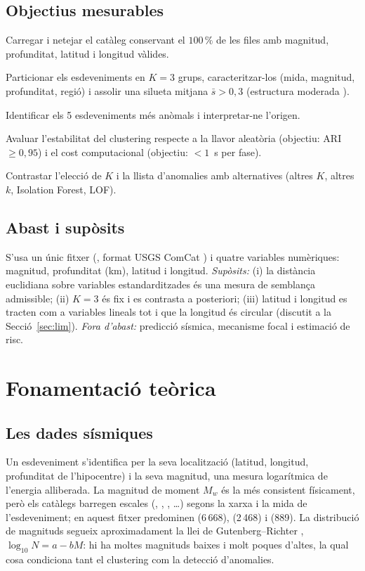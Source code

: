 \documentclass[10.5pt,a4paper]{article}
\newcommand{\py}[1]{\texttt{\detokenize{#1}}}
\begin{document}
\subsection{Objectius mesurables}
\begin{description}[leftmargin=1.1cm,labelwidth=0.9cm]
\item[O1] Carregar i netejar el catàleg conservant el $100\,\%$ de les files amb magnitud, profunditat, latitud i longitud vàlides.
\item[O2] Particionar els esdeveniments en $K=3$ grups, caracteritzar-los (mida, magnitud, profunditat, regió) i assolir una silueta mitjana $\bar s>0{,}3$ (estructura moderada \cite{kaufman}).
\item[O3] Identificar els 5 esdeveniments més anòmals i interpretar-ne l'origen.
\item[O4] Avaluar l'estabilitat del clustering respecte a la llavor aleatòria (objectiu: ARI $\ge0{,}95$) i el cost computacional (objectiu: $<1$~s per fase).
\item[O5] Contrastar l'elecció de $K$ i la llista d'anomalies amb alternatives (altres $K$, altres $k$, Isolation Forest, LOF).
\end{description}

\subsection{Abast i supòsits}
S'usa un únic fitxer (\py{earthquakes.csv}, format USGS ComCat \cite{usgs}) i quatre variables numèriques: magnitud, profunditat (km), latitud i longitud. \emph{Supòsits:} (i) la distància euclidiana sobre variables estandarditzades és una mesura de semblança admissible; (ii) $K=3$ és fix i es contrasta a posteriori; (iii) latitud i longitud es tracten com a variables lineals tot i que la longitud és circular (discutit a la Secció~\ref{sec:lim}). \emph{Fora d'abast:} predicció sísmica, mecanisme focal i estimació de risc.

\section{Fonamentaci\'o te\`orica}
\subsection{Les dades s\'ismiques}
Un esdeveniment s'identifica per la seva localitzaci\'o (latitud, longitud, profunditat de l'hipocentre) i la seva magnitud, una mesura logar\'itmica de l'energia alliberada. La magnitud de moment $M_w$ \cite{hanks} \'es la m\'es consistent f\'isicament, per\`o els catàlegs barregen escales (\py{ml}, \py{md}, \py{mb}, \py{mww}\ldots) segons la xarxa i la mida de l'esdeveniment; en aquest fitxer predominen \py{ml} (6\,668), \py{md} (2\,468) i \py{mb} (889). La distribuci\'o de magnituds segueix aproximadament la llei de Gutenberg--Richter \cite{gr}, $\log_{10}N=a-bM$: hi ha moltes magnituds baixes i molt poques d'altes, la qual cosa condiciona tant el clustering com la detecci\'o d'anomalies.
\end{document}
